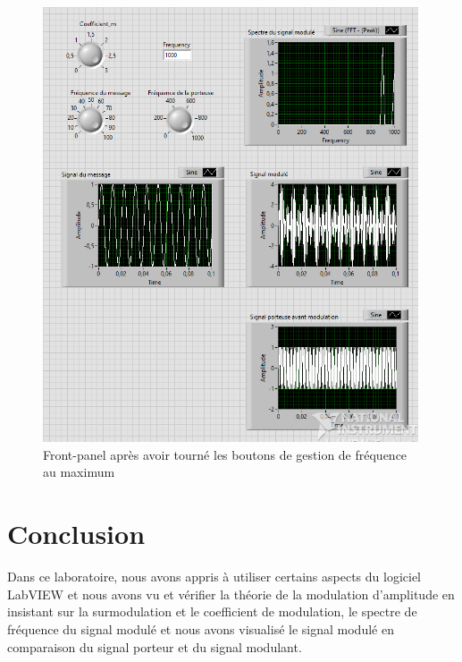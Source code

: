\documentclass[a4paper]{article}
\begin{document}
\begin{figure}[H]
    \centering
    \includegraphics[width=0.99\textwidth]{images/Capture006.PNG}
    \caption{Front-panel après avoir tourné les boutons de gestion de fréquence au maximum}
    \label{fig:f6}
\end{figure}













\section{Conclusion}





Dans ce laboratoire, nous avons appris à utiliser certains aspects du logiciel LabVIEW et nous avons vu et vérifier la théorie de la modulation d'amplitude en insistant sur la surmodulation et le coefficient de modulation, le spectre de fréquence du signal modulé et nous avons visualisé le signal modulé en comparaison du signal porteur et du signal modulant.
\end{document}
